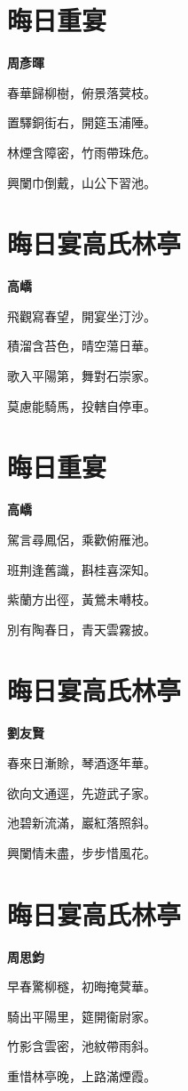 \documentclass[12pt,a4paper]{ctexbook}
\begin{document}
\section{晦日重宴}
\textbf{周彥暉}\par\vspace{0.5em}
春華歸柳樹，俯景落蓂枝。\par
置驛銅街右，開筵玉浦陲。\par
林煙含障密，竹雨帶珠危。\par
興闌巾倒戴，山公下習池。\par

\section{晦日宴高氏林亭}
\textbf{高嶠}\par\vspace{0.5em}
飛觀寫春望，開宴坐汀沙。\par
積溜含苔色，晴空蕩日華。\par
歌入平陽第，舞對石崇家。\par
莫慮能騎馬，投轄自停車。\par

\section{晦日重宴}
\textbf{高嶠}\par\vspace{0.5em}
駕言尋鳳侶，乘歡俯雁池。\par
班荆逢舊識，斟桂喜深知。\par
紫蘭方出徑，黃鶯未囀枝。\par
別有陶春日，青天雲霧披。\par

\section{晦日宴高氏林亭}
\textbf{劉友賢}\par\vspace{0.5em}
春來日漸賒，琴酒逐年華。\par
欲向文通逕，先遊武子家。\par
池碧新流滿，巖紅落照斜。\par
興闌情未盡，步步惜風花。\par

\section{晦日宴高氏林亭}
\textbf{周思鈞}\par\vspace{0.5em}
早春驚柳穟，初晦掩蓂華。\par
騎出平陽里，筵開衞尉家。\par
竹影含雲密，池紋帶雨斜。\par
重惜林亭晚，上路滿煙霞。\par
\end{document}
